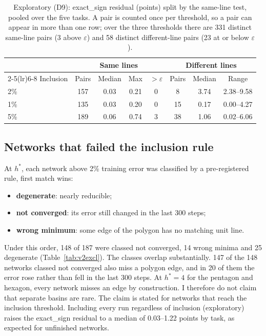 \documentclass[11pt]{article}
\newcommand{\md}[1]{\textsf{#1}}
\newcommand{\eps}{\varepsilon}
\begin{document}
\begin{table}[t]
\centering\small
\caption{Exploratory (D9): \md{exact\_sign} residual (points) split by the same-line test, pooled over the five tasks. A pair is counted once per threshold, so a pair can appear in more than one row; over the three thresholds there are 331 distinct same-line pairs (3 above $\eps$) and 58 distinct different-line pairs (23 at or below $\eps$).}
\label{tab:v2lines}
\begin{tabular}{@{}lccccccc@{}}
\toprule
& \multicolumn{4}{c}{Same lines} & \multicolumn{3}{c}{Different lines} \\
\cmidrule(lr){2-5}\cmidrule(lr){6-8}
Inclusion & Pairs & Median & Max & $> \eps$ & Pairs & Median & Range \\
\midrule
2\% & 157 & 0.03 & 0.21 & 0 & 8 & 3.74 & 2.38--9.58 \\
1\% & 135 & 0.03 & 0.20 & 0 & 15 & 0.17 & 0.00--4.27 \\
5\% & 189 & 0.06 & 0.74 & 3 & 38 & 1.06 & 0.02--6.06 \\
\bottomrule
\end{tabular}
\end{table}

\subsection{Networks that failed the inclusion rule}

At $h^*$, each network above 2\% training error was classified by a pre-registered rule, first match wins:
\begin{itemize}[leftmargin=*]
\item \textbf{degenerate}: nearly reducible;
\item \textbf{not converged}: its error still changed in the last 300 steps;
\item \textbf{wrong minimum}: some edge of the polygon has no matching unit line.
\end{itemize}
Under this order, 148 of 187 were classed not converged, 14 wrong minima and 25 degenerate (Table~\ref{tab:v2excl}). The classes overlap substantially. 147 of the 148 networks classed not converged also miss a polygon edge, and in 20 of them the error rose rather than fell in the last 300 steps. At $h^* = 4$ for the pentagon and hexagon, every network misses an edge by construction. I therefore do not claim that separate basins are rare. The claim is stated for networks that reach the inclusion threshold. Including every run regardless of inclusion (exploratory) raises the \md{exact\_sign} residual to a median of 0.03--1.22 points by task, as expected for unfinished networks.
\end{document}
